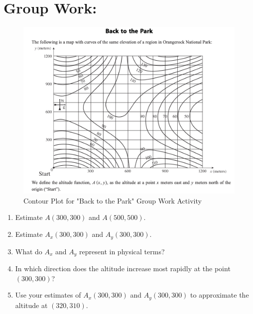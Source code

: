 \section*{Group Work:}
\begin{figure}[!h]

\includegraphics[]{Back-to-the-Park.png}
\caption{Contour Plot for "Back to the Park" Group Work Activity}
\end{figure}
\begin{enumerate}
\item Estimate \(A(300,300)\) and \(A(500,500)\).
\vfill
\item Estimate \(A_x(300,300)\) and \(A_y(300,300)\).
\vfill
\item What do \(A_x\) and \(A_y\) represent in physical terms?
\vfill

\item In which direction does the altitude increase most rapidly at the point \((300,300)\)?
\vfill

\item Use your estimates of \(A_x(300,300)\) and \(A_y(300,300)\) to approximate the altitude at \((320,310)\).
\vfill
\end{enumerate}


